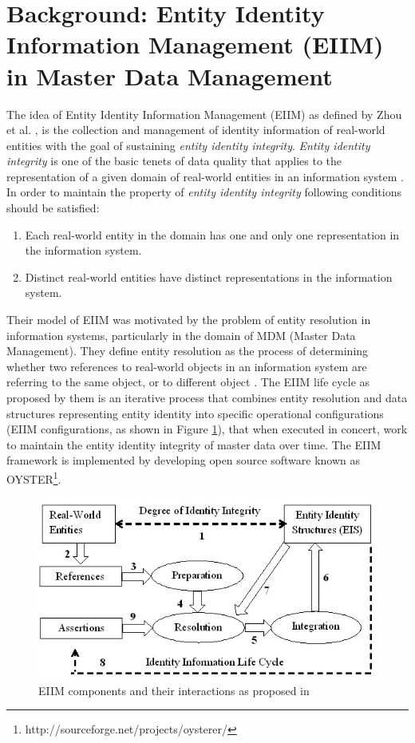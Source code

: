 \section{Background: Entity Identity Information Management (EIIM) in Master Data Management}
The idea of Entity Identity Information Management (EIIM) as defined by Zhou et al. \cite{zhou2011entity}, is the collection and management of identity information of real-world entities with the goal of sustaining \textit{entity identity integrity}. \textit{Entity identity integrity} is one of the basic tenets of data quality that applies to the representation of a given domain of real-world entities in an information system \cite{talburt2011entity}. In order to maintain the property of \textit{entity identity integrity} following conditions should be satisfied:

\begin{enumerate}
\item Each real-world entity in the domain has one and only one representation in the information system.

\item Distinct real-world entities have distinct representations in the information system.
\end{enumerate}


Their model of EIIM was motivated by the problem of entity resolution in information systems, particularly in the domain of MDM (Master Data Management). They define entity resolution as the process of determining whether two references to real-world objects in an information system are referring to the same object, or to different object \cite{talburt2011entity}. The EIIM life cycle as proposed by them is an iterative process that combines entity resolution and data structures representing entity identity into specific operational configurations (EIIM configurations, as shown in Figure \ref{originalEIIM}), that when executed in concert, work to maintain the entity identity integrity of master data over time. The EIIM framework is implemented by developing open source software known as OYSTER\footnote{http://sourceforge.net/projects/oysterer/}.

\begin{figure}[htbp]
  \caption{EIIM components and their interactions as proposed in \cite{zhou2011entity}}
\label{originalEIIM}
  \centering
    \includegraphics[width=12cm,height=6cm]{Figures/originalEIIM.jpg}
\end{figure}

